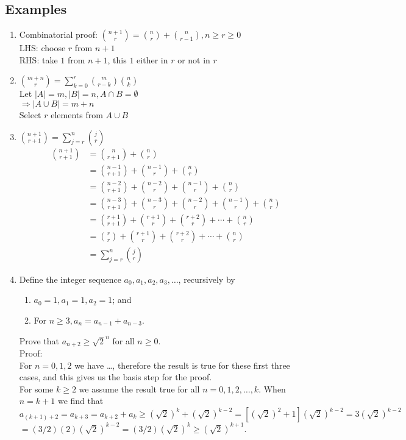 \documentclass[letter]{book}
\begin{document}
\subsection*{Examples}
\begin{enumerate}
    \item Combinatorial proof: $\binom{n+1}{r}=\binom{n}{r}+\binom{n}{r-1}, n\geq r\geq 0$\\
    LHS: choose $r$ from $n+1$\\
    RHS: take $1$ from $n+1$, this $1$ either in $r$ or not in $r$
    \item $\binom{m+n}{r}=\sum_{k=0}^{r}{\binom{m}{r-k}\binom{n}{k}}$\\
    Let $|A|=m,|B|=n,A\cap B=\emptyset$\\
    $\Rightarrow |{A \cup B}|=m+n$\\
    Select $r$ elements from ${A \cup B}$
    \item $\binom{n+1}{r+1}=\sum_{j=r}^{n}{\binom{j}{r}}$
    \begin{align*}
    \binom{n+1}{r+1}&=\binom{n}{r+1}+\binom{n}{r}\\
    &=\binom{n-1}{r+1}+\binom{n-1}{r}+\binom{n}{r}\\
    &=\binom{n-2}{r+1}+\binom{n-2}{r}+\binom{n-1}{r}+\binom{n}{r}\\
    &=\binom{n-3}{r+1}+\binom{n-3}{r}+\binom{n-2}{r}+\binom{n-1}{r}+\binom{n}{r}\\
    &=\binom{r+1}{r+1}+\binom{r+1}{r}+\binom{r+2}{r}+\cdots+\binom{n}{r}\\
    &=\binom{r}{r}+\binom{r+1}{r}+\binom{r+2}{r}+\cdots+\binom{n}{r}\\
    &=\sum_{j=r}^{n}{\binom{j}{r}}
    \end{align*}
    \item Define the integer sequence $a_0,a_1,a_2,a_3,\ldots$, recursively by
    \begin{enumerate}
        \item $a_0=1,a_1=1,a_2=1$; and
        \item For $n\geq 3, a_n=a_{n-1}+a_{n-3}$.
    \end{enumerate}
    Prove that $a_{n+2}\geq {\sqrt{2}}^n$ for all $n\geq0$.\\
    Proof:\\
    For $n=0,1,2$ we have \ldots, therefore the result is true for these first three cases, and this gives us the basis step for the proof.\\
    For some $k\geq 2$ we assume the result true for all $n=0,1,2,\ldots,k$. When $n=k+1$ we find that\\
    $a_{(k+1)+2}=a_{k+3}=a_{k+2}+a_k\geq (\sqrt{2})^k+(\sqrt{2})^{k-2}=[(\sqrt{2})^2+1](\sqrt{2})^{k-2}=3(\sqrt{2})^{k-2}$\\
    $=(3/2)(2)(\sqrt{2})^{k-2}=(3/2)(\sqrt{2})^k\geq (\sqrt{2})^{k+1}$.
\end{enumerate}
\end{document}
